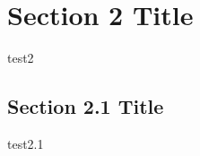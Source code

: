 \section{Section 2 Title}
\label{sec:section2}

test2

\subsection{Section 2.1 Title}
\label{sec:section2.1}

test2.1